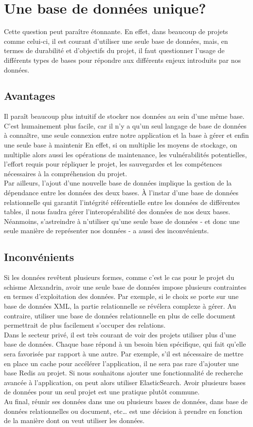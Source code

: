     \section{Une base de données unique?}

Cette question peut paraître étonnante. En effet, dans beaucoup de projets comme celui-ci, il est courant d’utiliser une seule base de données, mais, en termes de durabilité et d’objectifs du projet, il faut questionner l’usage de différents types de bases pour répondre aux différents enjeux introduits par nos données. 


    \subsection{Avantages}

Il paraît beaucoup plus intuitif de stocker nos données au sein d'une même base. C’est humainement plus facile, car il n’y a qu’un seul langage de base de données à connaître, une seule connexion entre notre application et la base à gérer et enfin une seule base à maintenir  En effet, si on multiplie les moyens de stockage, on multiplie alors aussi les opérations de maintenance, les vulnérabilités potentielles, l’effort requis pour répliquer le projet, les sauvegardes et les compétences nécessaires à la compréhension du projet.\\ 
Par ailleurs, l’ajout d’une nouvelle base de données implique la gestion de la dépendance entre les données des deux bases. À l’instar d’une base de données relationnelle qui garantit l’intégrité référentielle entre les données de différentes tables, il nous faudra gérer l’interopérabilité des données de nos deux bases.\\
Néanmoins, s’astreindre à n’utiliser qu’une seule base de données - et donc une seule manière de représenter nos données - a aussi des inconvénients.
    
    \subsection{Inconvénients}

Si les données revêtent plusieurs formes, comme c’est le cas pour le projet du schisme Alexandrin, avoir une seule base de données impose plusieurs contraintes en termes d’exploitation des données. Par exemple, si le choix se porte sur une base de données XML, la partie relationnelle se révélera complexe à gérer. Au contraire, utiliser une base de données relationnelle en plus de celle document permettrait de plus facilement s’occuper des relations.\\ 
Dans le secteur privé, il est très courant de voir des projets utiliser plus d’une base de données. Chaque base répond à un besoin bien spécifique, qui fait qu’elle sera favorisée par rapport à une autre. Par exemple, s’il est nécessaire de mettre en place un cache pour accélérer l’application, il ne sera pas rare d’ajouter une base Redis au projet. Si nous souhaitons ajouter une fonctionnalité de recherche avancée à l’application, on peut alors utiliser ElasticSearch. Avoir plusieurs bases de données pour un seul projet est une pratique plutôt commune.\\


	Au final, réunir ses données dans une ou plusieurs bases de données, dans base de données relationnelles ou document, etc… est une décision à prendre en fonction de la manière dont on veut utiliser les données.
